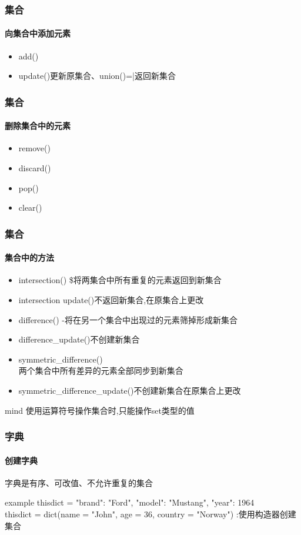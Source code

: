 \documentclass{beamer}
\begin{document}
\begin{frame}[t]
	\frametitle{集合}
	\framesubtitle{向集合中添加元素}
	\begin{itemize}
		\item add()
		\item update()更新原集合、union()=|返回新集合
	\end{itemize}
\end{frame}

\begin{frame}[t]
	\frametitle{集合}
	\framesubtitle{删除集合中的元素}
	\begin{itemize}
		\item remove()
		\item discard()
		\item pop()
		\item clear()
	\end{itemize}
\end{frame}
\begin{frame}[t]
	\frametitle{集合}
	\framesubtitle{集合中的方法}
	\begin{itemize}
		\item intersection() 	\$将两集合中所有重复的元素返回到新集合
		\item intersection	update()不返回新集合,在原集合上更改
		\item difference()	-将在另一个集合中出现过的元素筛掉形成新集合
		\item difference\_update()不创建新集合
		\item symmetric\_difference() \^	\\ 两个集合中所有差异的元素全部同步到新集合
		\item symmetric\_difference\_update()不创建新集合在原集合上更改

	\end{itemize}
	\begin{alertblock}{mind}
		使用运算符号操作集合时,只能操作set类型的值
	\end{alertblock}

\end{frame}
\begin{frame}[t]
	\frametitle{字典}
	\framesubtitle{创建字典}
	字典是有序、可改值、不允许重复的集合
	\begin{block}{example}
		thisdict = {
		"brand": "Ford",
		"model": "Mustang",
		"year": 1964
		}\\
		thisdict = dict(name = "John", age = 36, country = "Norway") :使用构造器创建集合
	\end{block}

\end{frame}
\end{document}
